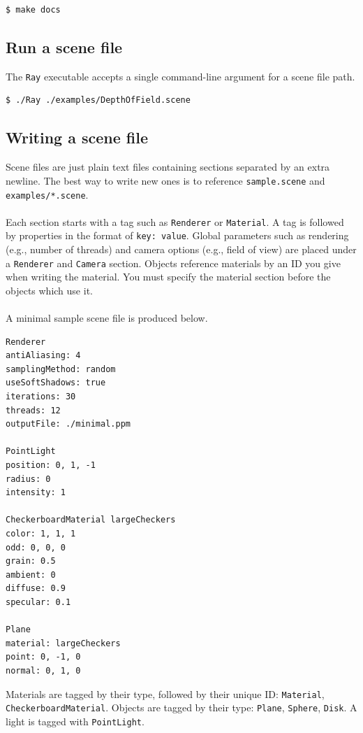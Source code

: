 \documentclass{article}
\begin{document}
\begin{verbatim}
$ make docs
\end{verbatim}

\subsection{Run a scene file}

The \texttt{Ray} executable accepts a single command-line argument for a scene file path.

\begin{verbatim}
$ ./Ray ./examples/DepthOfField.scene
\end{verbatim}

\subsection{Writing a scene file}

Scene files are just plain text files containing sections separated by an extra newline.
The best way to write new ones is to reference \texttt{sample.scene} and \texttt{examples/*.scene}.
\\\\
\noindent
Each section starts with a tag such as \texttt{Renderer} or \texttt{Material}.
A tag is followed by properties in the format of \texttt{key: value}.
Global parameters such as rendering (e.g., number of threads) and camera options (e.g., field of view) are placed under a \texttt{Renderer} and \texttt{Camera} section.
Objects reference materials by an ID you give when writing the material.
You must specify the material section before the objects which use it.
\\\\
\noindent
A minimal sample scene file is produced below.

\begin{verbatim}
Renderer
antiAliasing: 4
samplingMethod: random
useSoftShadows: true
iterations: 30
threads: 12
outputFile: ./minimal.ppm

PointLight
position: 0, 1, -1
radius: 0
intensity: 1

CheckerboardMaterial largeCheckers
color: 1, 1, 1
odd: 0, 0, 0
grain: 0.5
ambient: 0
diffuse: 0.9
specular: 0.1

Plane
material: largeCheckers
point: 0, -1, 0
normal: 0, 1, 0
\end{verbatim}

\noindent
Materials are tagged by their type, followed by their unique ID: \texttt{Material}, \texttt{CheckerboardMaterial}.
Objects are tagged by their type: \texttt{Plane}, \texttt{Sphere}, \texttt{Disk}.
A light is tagged with \texttt{PointLight}.
\end{document}
